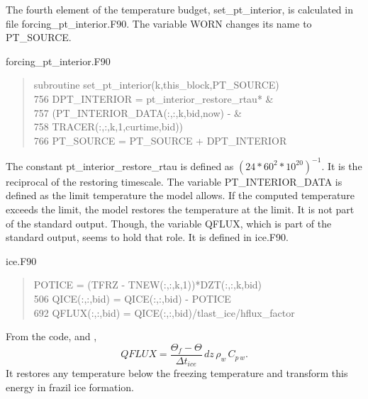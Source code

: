 \begin{appendices}
The fourth element of the temperature budget, set\_pt\_interior, is calculated in file forcing\_pt\_interior.F90. The variable WORN changes its name to PT\_SOURCE. 
\begin{center} forcing\_pt\_interior.F90 \end{center}
\begin{quotation}
\small
\linespread{0.5}\selectfont{} \hspace{1em} subroutine set\_pt\_interior(k,this\_block,PT\_SOURCE)\\
756 \hspace{1em}           DPT\_INTERIOR = pt\_interior\_restore\_rtau*         \&\\
757 \hspace{1em}                         (PT\_INTERIOR\_DATA(:,:,k,bid,now) - \&\\
758 \hspace{1em}                          TRACER(:,:,k,1,curtime,bid))\\
766 \hspace{1em}     PT\_SOURCE = PT\_SOURCE + DPT\_INTERIOR\\
\end{quotation}
The constant pt\_interior\_restore\_rtau is defined as $(24*60^2*10^{20})^{-1}$. It is the reciprocal of the restoring timescale. The variable PT\_INTERIOR\_DATA is defined as the limit temperature the model allows. If the computed temperature exceeds the limit, the model restores the temperature at the limit. It is not part of the standard output. Though, the variable QFLUX, which is part of the standard output, seems to hold that role. It is defined in ice.F90.
\begin{center} ice.F90 \end{center}
\begin{quotation}
\small
\linespread{0.5}\selectfont{} \hspace{1em}            POTICE = (TFRZ - TNEW(:,:,k,1))*DZT(:,:,k,bid)\\
506 \hspace{1em}      QICE(:,:,bid) = QICE(:,:,bid) - POTICE\\
692  \hspace{1em}   QFLUX(:,:,bid) = QICE(:,:,bid)/tlast\_ice/hflux\_factor\\
\end{quotation}
\noindent From the code, \cite{Hunke:2008ly} and \cite{SG4},
\begin{equation}
 QFLUX = \frac{\Theta_f - \Theta}{\Delta t_{ice}} \, dz \, \rho_w \, C_{p\,w}.
\end{equation}
It restores any temperature below the freezing temperature and transform this energy in frazil ice formation. 


\end{appendices}
